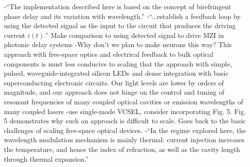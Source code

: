 -``The implementation described here is based on the concept of birefringent phase delay and its variation with wavelength.''
-``...establish a feedback loop by using the detected signal as the input to the circuit that produces the driving current $i(t)$.'' Make comparison to using detected signal to drive MZI in photonic delay systems
-Why don't we plan to make neurons this way? This approach with free-space optics and electrical feedback to bulk optical components is must less conducive to scaling that the approach with simple, pulsed, waveguide-integrated silicon LEDs and dense integration with basic superconducting electronic circuits. Our light levels are lower by orders of magnitude, and our approach does not hinge on the control and tuning of resonant frequencies of many coupled optical cavities or emission wavelengths of many coupled lasers
-use single-mode VCSEL, consider incorporating Fig. 5. Fig. 5 demonstrates why such an approach is difficult to scale. Goes back to the basic challenges of scaling free-space optical devices. 
-``In the regime explored here, the wavelength modulation mechanism is mainly thermal: current injection increases the temperature, and hence the index of refraction, as well as the cavity length through thermal expansion.''


